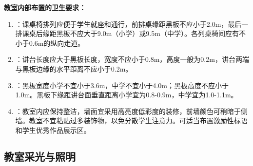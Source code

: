 \begin{defbox}
\textbf{教室内部布置的卫生要求：}

\begin{enumerate}[leftmargin=*]
    \item {}：课桌椅排列应便于学生就座和通行，前排桌缘距黑板不应小于2.0m，最后一排课桌后缘距黑板不应大于9.0m（小学）或9.5m（中学）。各列桌椅间应有不小于0.6m的纵向走道。

    \item {}：讲台长度应大于黑板长度，宽度不应小于0.8m，高度一般为0.2m，讲台两端与黑板边缘的水平距离不应小于0.2m。

    \item {}：黑板宽度小学不宜小于3.6m，中学不宜小于4.0m；黑板高度不应小于1.0m。黑板下缘距讲台面垂直距离小学宜为0.8-0.9m，中学宜为1.0-1.1m。

    \item {}：教室内应保持整洁，墙面宜采用高亮度低彩度的装修，前墙颜色可稍暗于侧墙。教室不宜粘贴过多装饰物，以免分散学生注意力。可适当布置激励性标语和学生优秀作品展示区。
\end{enumerate}
\end{defbox}

\subsection{教室采光与照明}

